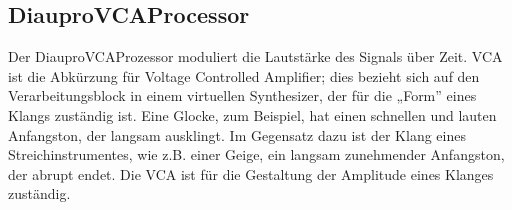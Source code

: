 \subsection{DiauproVCAProcessor}

Der DiauproVCAProzessor moduliert die Lautstärke des Signals über Zeit. VCA ist die Abkürzung für Voltage Controlled Amplifier; dies bezieht sich auf den Verarbeitungsblock in einem virtuellen Synthesizer, der für die  „Form” eines Klangs zuständig ist. Eine Glocke, zum Beispiel, hat einen schnellen und lauten Anfangston, der langsam ausklingt. Im Gegensatz dazu ist der  Klang eines Streichinstrumentes, wie z.B. einer Geige, ein langsam zunehmender Anfangston, der abrupt endet. Die VCA ist für die Gestaltung der Amplitude eines Klanges zuständig.